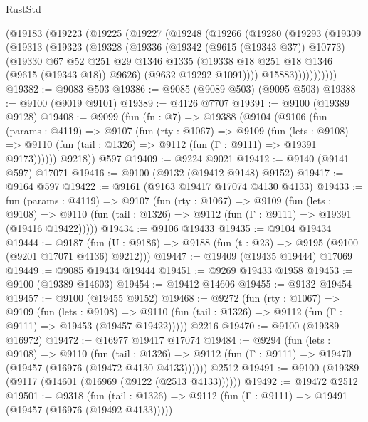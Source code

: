 \begin{lexlean}{RustStd}
\begin{coremodule}
    (@19183
      (@19223
        (@19225
          (@19227
            (@19248
              (@19266
                (@19280
                  (@19293
                    (@19309
                      (@19313
                        (@19323
                          (@19328
                            (@19336
                              (@19342 (@9615 (@19343 @37)) @10773)
                              (@19330
                                @67
                                @52
                                @251
                                @29
                                @1346
                                @1335
                                (@19338 @18 @251 @18 @1346 (@9615 (@19343 @18)) @9626)
                                (@9632 @19292 @1091))))
                          @15883)))))))))))
@19382 := @9083 @503
@19386 := @9085 (@9089 @503) (@9095 @503)
@19388 := @9100 (@9019 @9101)
@19389 := @4126 @7707
@19391 := @9100 (@19389 @9128)
@19408 := @9099
    (fun (fn : @7) =>
    @19388
      (@9104
        (@9106
          (fun (params : @4119) =>
          @9107
            (fun (rty : @1067) =>
            @9109
              (fun (lets : @9108) =>
              @9110 (fun (tail : @1326) => @9112 (fun (Γ : @9111) => @19391 @9173))))))
        @9218))
    @597
@19409 := @9224 @9021
@19412 := @9140 (@9141 @597) @17071
@19416 := @9100 (@9132 (@19412 @9148) @9152)
@19417 := @9164 @597
@19422 := @9161 (@9163 @19417 @17074 @4130 @4133)
@19433 := fun (params : @4119) =>
  @9107
    (fun (rty : @1067) =>
    @9109
      (fun (lets : @9108) =>
      @9110 (fun (tail : @1326) => @9112 (fun (Γ : @9111) => @19391 (@19416 @19422)))))
@19434 := @9106 @19433
@19435 := @9104 @19434
@19444 := @9187
    (fun (U : @9186) => @9188 (fun (t : @23) => @9195 (@9100 (@9201 @17071 @4136) @9212)))
@19447 := @19409 (@19435 @19444) @17069
@19449 := @9085 @19434 @19444
@19451 := @9269 @19433 @1958
@19453 := @9100 (@19389 @14603)
@19454 := @19412 @14606
@19455 := @9132 @19454
@19457 := @9100 (@19455 @9152)
@19468 := @9272
    (fun (rty : @1067) =>
    @9109
      (fun (lets : @9108) =>
      @9110 (fun (tail : @1326) => @9112 (fun (Γ : @9111) => @19453 (@19457 @19422)))))
    @2216
@19470 := @9100 (@19389 @16972)
@19472 := @16977 @19417 @17074
@19484 := @9294
    (fun (lets : @9108) =>
    @9110
      (fun (tail : @1326) =>
      @9112 (fun (Γ : @9111) => @19470 (@19457 (@16976 (@19472 @4130 @4133))))))
    @2512
@19491 := @9100 (@19389 (@9117 (@14601 (@16969 (@9122 (@2513 @4133))))))
@19492 := @19472 @2512
@19501 := @9318
    (fun (tail : @1326) => @9112 (fun (Γ : @9111) => @19491 (@19457 (@16976 (@19492 @4133)))))

\end{coremodule}
\end{lexlean}
